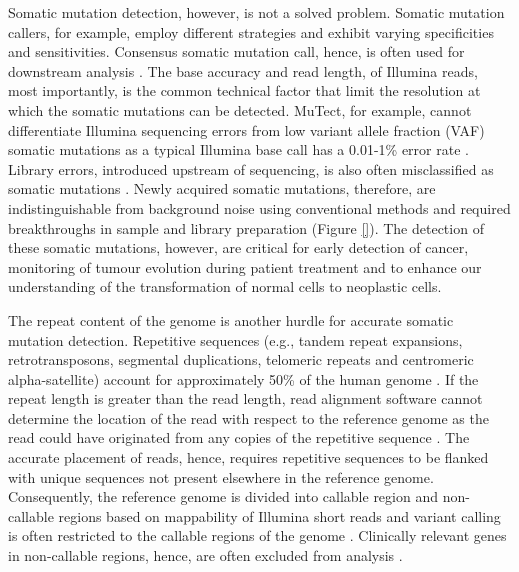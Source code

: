 Somatic mutation detection, however, is not a solved problem. Somatic mutation callers, for example, employ different strategies and exhibit varying specificities and sensitivities. Consensus somatic mutation call, hence, is often used for downstream analysis \cite{Bailey2020-ou}. The base accuracy and read length, of Illumina reads, most importantly, is the common technical factor that limit the resolution at which the somatic mutations can be detected. MuTect, for example, cannot differentiate Illumina sequencing errors from low variant allele fraction (VAF) somatic mutations as a typical Illumina base call has a 0.01-1\% error rate \cite{Cibulskis2013-gw}. Library errors, introduced upstream of sequencing, is also often misclassified as somatic mutations \cite{Costello2013-cz, Chen2017-ba, Abascal2021-pk}. Newly acquired somatic mutations, therefore, are indistinguishable from background noise using conventional methods and required breakthroughs in sample and library preparation (Figure \ref{}). The detection of these somatic mutations, however, are critical for early detection of cancer, monitoring of tumour evolution during patient treatment and to enhance our understanding of the transformation of normal cells to neoplastic cells. 

The repeat content of the genome is another hurdle for accurate somatic mutation detection. Repetitive sequences (e.g., tandem repeat expansions, retrotransposons, segmental duplications, telomeric repeats and centromeric alpha-satellite) account for approximately 50\% of the human genome \cite{Lander2001-du}. If the repeat length is greater than the read length, read alignment software cannot determine the location of the read with respect to the reference genome as the read could have originated from any copies of the repetitive sequence \cite{Li2008-dt}. The accurate placement of reads, hence, requires repetitive sequences to be flanked with unique sequences not present elsewhere in the reference genome. Consequently, the reference genome is divided into callable region and non-callable regions based on mappability of Illumina short reads and variant calling is often restricted to the callable regions of the genome \cite{1000_Genomes_Project_Consortium2012-rj}. Clinically relevant genes in non-callable regions, hence, are often excluded from analysis \cite{Wagner2022-ph}.

